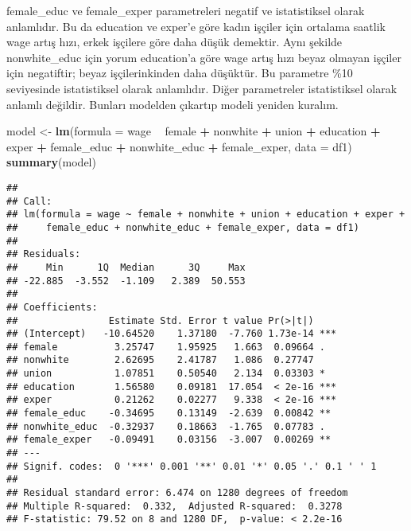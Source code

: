 \documentclass[
]{book}
\newenvironment{Shaded}{\begin{snugshade}}{\end{snugshade}}
\newcommand{\DataTypeTok}[1]{\textcolor[rgb]{0.13,0.29,0.53}{#1}}
\newcommand{\KeywordTok}[1]{\textcolor[rgb]{0.13,0.29,0.53}{\textbf{#1}}}
\newcommand{\NormalTok}[1]{#1}
\newcommand{\OperatorTok}[1]{\textcolor[rgb]{0.81,0.36,0.00}{\textbf{#1}}}
\newcommand{\StringTok}[1]{\textcolor[rgb]{0.31,0.60,0.02}{#1}}
\begin{document}
female\_educ ve female\_exper parametreleri negatif ve istatistiksel olarak anlamlıdır. Bu da education ve exper'e göre kadın işçiler için ortalama saatlik wage artış hızı, erkek işçilere göre daha düşük demektir. Aynı şekilde nonwhite\_educ için yorum education'a göre wage artış hızı beyaz olmayan işçiler için negatiftir; beyaz işçilerinkinden daha düşüktür. Bu parametre \%10 seviyesinde istatistiksel olarak anlamlıdır. Diğer parametreler istatistiksel olarak anlamlı değildir. Bunları modelden çıkartıp modeli yeniden kuralım.

\begin{Shaded}
\begin{Highlighting}[]
\NormalTok{model <-}\StringTok{ }\KeywordTok{lm}\NormalTok{(}\DataTypeTok{formula =}\NormalTok{ wage }\OperatorTok{~}\StringTok{ }\NormalTok{female }\OperatorTok{+}\StringTok{ }\NormalTok{nonwhite }\OperatorTok{+}\StringTok{ }\NormalTok{union }\OperatorTok{+}\StringTok{ }\NormalTok{education }\OperatorTok{+}\StringTok{ }\NormalTok{exper }\OperatorTok{+}\StringTok{ }\NormalTok{female_educ }\OperatorTok{+}\StringTok{ }\NormalTok{nonwhite_educ }\OperatorTok{+}\StringTok{ }\NormalTok{female_exper, }\DataTypeTok{data =}\NormalTok{ df1)}
\KeywordTok{summary}\NormalTok{(model)}
\end{Highlighting}
\end{Shaded}

\begin{verbatim}
## 
## Call:
## lm(formula = wage ~ female + nonwhite + union + education + exper + 
##     female_educ + nonwhite_educ + female_exper, data = df1)
## 
## Residuals:
##     Min      1Q  Median      3Q     Max 
## -22.885  -3.552  -1.109   2.389  50.553 
## 
## Coefficients:
##                Estimate Std. Error t value Pr(>|t|)    
## (Intercept)   -10.64520    1.37180  -7.760 1.73e-14 ***
## female          3.25747    1.95925   1.663  0.09664 .  
## nonwhite        2.62695    2.41787   1.086  0.27747    
## union           1.07851    0.50540   2.134  0.03303 *  
## education       1.56580    0.09181  17.054  < 2e-16 ***
## exper           0.21262    0.02277   9.338  < 2e-16 ***
## female_educ    -0.34695    0.13149  -2.639  0.00842 ** 
## nonwhite_educ  -0.32937    0.18663  -1.765  0.07783 .  
## female_exper   -0.09491    0.03156  -3.007  0.00269 ** 
## ---
## Signif. codes:  0 '***' 0.001 '**' 0.01 '*' 0.05 '.' 0.1 ' ' 1
## 
## Residual standard error: 6.474 on 1280 degrees of freedom
## Multiple R-squared:  0.332,  Adjusted R-squared:  0.3278 
## F-statistic: 79.52 on 8 and 1280 DF,  p-value: < 2.2e-16
\end{verbatim}
\end{document}
